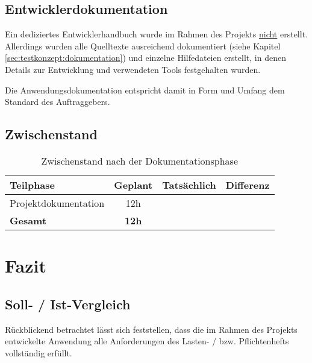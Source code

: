 \documentclass[12pt, xcolor=dvipsnames]{scrartcl}
\begin{document}
\subsection{Entwicklerdokumentation}

Ein dediziertes Entwicklerhandbuch wurde im Rahmen des Projekts \underline{nicht} erstellt. Allerdings wurden alle Quelltexte ausreichend dokumentiert (siehe Kapitel \ref{sec:testkonzept:dokumentation}) und einzelne Hilfedateien erstellt, in denen Details zur Entwicklung und verwendeten Tools festgehalten wurden.

Die Anwendungsdokumentation entspricht damit in Form und Umfang dem Standard des Auftraggebers.

\subsection{Zwischenstand}

\begin{table}[H]
	\centering
	\begin{tabular}{lccc}

		\rowcolor{white!15}				
		\textbf{Teilphase} & \textbf{Geplant} & \textbf{Tatsächlich} & \textbf{Differenz} \\\hline		
		
		\rowcolor{gray!15}
		Projektdokumentation & 12h & \timeDokumentation & \timeDokumentationDiff\\\hline        	    	    

		\rowcolor{white!15}				
		\textbf{Gesamt} & \textbf{12h} & \textbf{\timeDokumentation} & \textbf{\timeDokumentationDiff} \\			

	    
	\end{tabular}
	\caption{Zwischenstand nach der Dokumentationsphase}
	\label{tab:zwischenstand_dokumentationsphase}
\end{table}

\section{Fazit}

\subsection{Soll- / Ist-Vergleich}

Rückblickend betrachtet lässt sich feststellen, dass die im Rahmen des Projekts entwickelte Anwendung alle Anforderungen des Lasten- / bzw. Pflichtenhefts vollständig erfüllt.
\end{document}
